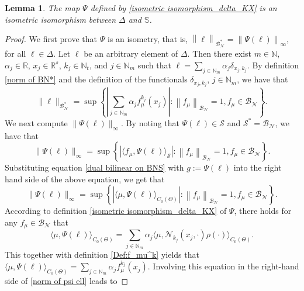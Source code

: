 \documentclass[11pt]{article}
\newtheorem{lemma}[theorem]{Lemma}
\begin{document}
\begin{lemma}\label{Lemma:isometric isomorphism_delta_KX}
The map $\Psi$ defined by \eqref{isometric isomorphism_delta_KX} is an isometric isomorphism between $\Delta$ and $\mathbb{S}$. 
\end{lemma}
\begin{proof}
We first prove that $\Psi$ is an isometry, that is, $\left\|\ell\right\|_{\mathcal{B}_{\mathcal{N}}^*}=\left\|\Psi(\ell)\right\|_{\infty}$, for all $\ell\in\Delta$. Let  $\ell$ be an arbitrary element of $\Delta$. Then there exist $m\in\mathbb{N}$, $\alpha_{j}\in\mathbb{R}$, ${x}_j\in\mathbb{R}^s$, $k_j\in\mathbb{N}_t$, and $j\in\mathbb{N}_m$ such that $\ell=\sum_{j\in\mathbb{N}_m}\alpha_{j}\delta_{{x}_j,k_j}$. By definition \eqref{norm of BN*} and the definition of the functionals $\delta_{x_j,k_j}$, $j\in\mathbb{N}_m$, we have that 
       \begin{equation}\label{proof norm of ell}
        \|\ell\|_{\mathcal{B}_{\mathcal{N}}^*}=\sup\left\{\left|\sum_{j\in\mathbb{N}_m}\alpha_{j} f_\mu^{k_j}(x_j)\right|:\left\|f_\mu\right\|_{\mathcal{B}_{\mathcal{N}}}=1, f_\mu\in\mathcal{B}_{\mathcal{N}}\right\}.
    \end{equation}
    We next compute $\|\Psi(\ell)\|_{\infty}$.
    By noting that $\Psi(\ell)\in \mathcal{S}$ and $\mathcal{S}^*=\mathcal{B}_{\mathcal{N}}$, we have that 
    $$
    \|\Psi(\ell)\|_\infty=\sup\left\{\left|\langle f_\mu, \Psi(\ell)\rangle_{\mathcal{S}}\right|:\left\|f_\mu\right\|_{\mathcal{B}_{\mathcal{N}}}=1, f_\mu\in\mathcal{B}_{\mathcal{N}}\right\}.
    $$
    Substituting equation \eqref{dual bilinear on BNS} with $g:=\Psi(\ell)$ into the right hand side of the above equation, we get that 
    \begin{equation}\label{norm of psi ell}
        \|\Psi(\ell)\|_\infty=\sup\left\{\left|\langle \mu, \Psi(\ell)\rangle_{C_0(\Theta)}\right|:\left\|f_\mu\right\|_{\mathcal{B}_{\mathcal{N}}}=1, f_\mu\in\mathcal{B}_{\mathcal{N}}\right\}.
    \end{equation}
    According to definition \eqref{isometric isomorphism_delta_KX} of $\Psi$, there holds for any $f_{\mu}\in\mathcal{B}_{\mathcal{N}}$ that
    $$
    \langle \mu, \Psi(\ell)\rangle_{C_0(\Theta)}=\sum_{j\in\mathbb{N}_m}\alpha_{j} \langle \mu,\mathcal{N}_{k_j}({x}_j,\cdot)\rho(\cdot)\rangle_{C_0(\Theta)}.
    $$
    This together with definition \eqref{Def:f_mu^k} yields that 
    $
    \langle \mu, \Psi(\ell)\rangle_{C_0(\Theta)}=\sum_{j\in\mathbb{N}_m}\alpha_{j} f_{\mu}^{k_j}(x_j).
    $
    Involving this equation in the right-hand side of \eqref{norm of psi ell} leads to

\end{proof}
\end{document}
